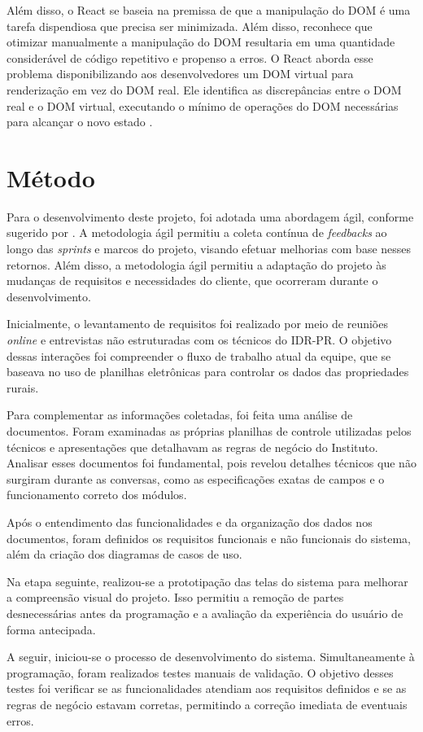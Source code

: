 Além disso, o React se baseia na premissa de que a manipulação do \gls{DOM} é uma tarefa dispendiosa que precisa ser minimizada. Além disso, reconhece que otimizar manualmente a manipulação do \gls{DOM} resultaria em uma quantidade considerável de código repetitivo e propenso a erros. O React aborda esse problema disponibilizando aos desenvolvedores um \gls{DOM} virtual para renderização em vez do \gls{DOM} real. Ele identifica as discrepâncias entre o \gls{DOM} real e o \gls{DOM} virtual, executando o mínimo de operações do \gls{DOM} necessárias para alcançar o novo estado \cite{Vipul:2016:ReactJSByExampleBuildingModernWebApplications}.

\section{Método}\label{sec:metodo}

Para o desenvolvimento deste projeto, foi adotada uma abordagem ágil, conforme sugerido por . A metodologia ágil permitiu a coleta contínua de \textit{feedbacks} ao longo das \textit{sprints} e marcos do projeto, visando efetuar melhorias com base nesses retornos.
Além disso, a metodologia ágil permitiu a adaptação do projeto às mudanças de requisitos e necessidades do cliente, que ocorreram durante o desenvolvimento.

Inicialmente, o levantamento de requisitos foi realizado por meio de reuniões \textit{online} e entrevistas não estruturadas com os técnicos do \gls{IDR-PR}. O objetivo dessas interações foi compreender o fluxo de trabalho atual da equipe, que se baseava no uso de planilhas eletrônicas para controlar os dados das propriedades rurais. 

Para complementar as informações coletadas, foi feita uma análise de documentos. Foram examinadas as próprias planilhas de controle utilizadas pelos técnicos e apresentações que detalhavam as regras de negócio do Instituto. Analisar esses documentos foi fundamental, pois revelou detalhes técnicos que não surgiram durante as conversas, como as especificações exatas de campos e o funcionamento correto dos módulos.

Após o entendimento das funcionalidades e da organização dos dados nos documentos, foram definidos os requisitos funcionais e não funcionais do sistema, além da criação dos diagramas de casos de uso.

Na etapa seguinte, realizou-se a prototipação das telas do sistema para melhorar a compreensão visual do projeto. Isso permitiu a remoção de partes desnecessárias antes da programação e a avaliação da experiência do usuário de forma antecipada.

A seguir, iniciou-se o processo de desenvolvimento do sistema. Simultaneamente à programação, foram realizados testes manuais de validação. O objetivo desses testes foi verificar se as funcionalidades atendiam aos requisitos definidos e se as regras de negócio estavam corretas, permitindo a correção imediata de eventuais erros.

